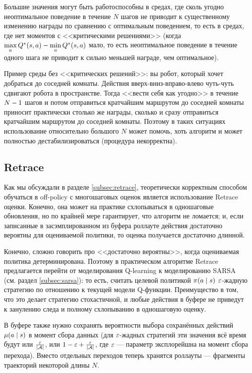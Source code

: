 Большие значения могут быть работоспособны в средах, где сколь угодно неоптимальное поведение в течение $N$ шагов не приводит к существенному изменению награды по сравнению с оптимальным поведением, то есть в средах, где нет моментов с <<критическими решениями>> (когда $\max\limits_a Q^*(s, a) \HM- \min\limits_a Q^*(s, a)$ мало, то есть неоптимальное поведение в течение одного шага не приводит к сильно меньшей награде, чем оптимальное).

\begin{example}
Пример среды без <<критических решений>>: вы робот, который хочет добраться до соседней комнаты. Действия вверх-вниз-вправо-влево чуть-чуть сдвигают робота в пространстве. Тогда <<вести себя как угодно>> в течение $N \HM- 1$ шагов и потом отправиться кратчайшим маршрутом до соседней комнаты приносит практически столько же награды, сколько и сразу отправиться кратчайшим маршрутом до соседней комнаты. Поэтому в таких ситуациях использование относительно большого $N$ может помочь, хоть алгоритм и может полностью дестабилизироваться (процедура некорректна).
\end{example}

\subsection{Retrace}

Как мы обсуждали в разделе \ref{subsec:retrace}, теоретически корректным способом обучаться в off-policy с многошаговых оценок является использование Retrace оценки. Конечно, она может на практике схлопываться в одношаговые обновления, но по крайней мере гарантирует, что алгоритм не ломается; и, если записанные в засэмплированном из буфера роллауте действия достаточно вероятны для оцениваемой политики, то оценка получается достаточно длинной.

Конечно, сложно говорить про <<достаточно вероятны>>, когда оцениваемая политика детерминирована. Поэтому в практическом алгоритме Retrace предлагается перейти от моделирования Q-learning к моделированию SARSA (см. раздел \ref{subsec:sarsa}): то есть, считать целевой политикой $\pi(a \HM \mid s)$ $\varepsilon$-жадную стратегию по отношению к текущей модели Q-функции. Преимущество в том, что это делает стратегию стохастичной, и любые действия в буфере не приведут к занулению следа и полному схлопыванию в одношаговую оценку.

В буфере также нужно сохранять вероятности выбора сохранённых действий $\mu(a \HM\mid s)$ в момент сбора данных (для $\varepsilon$-жадных стратегий эти значения всё время будут или $\frac{\varepsilon}{|\mathcal{A}|}$, или $1 \HM- \eps \HM+ \frac{\eps}{|\A|}$, где $\varepsilon$ --- параметр эксплорейшна на момент сбора перехода). Вместо отдельных переходов теперь хранятся роллауты --- фрагменты траекторий некоторой длины $N$.

